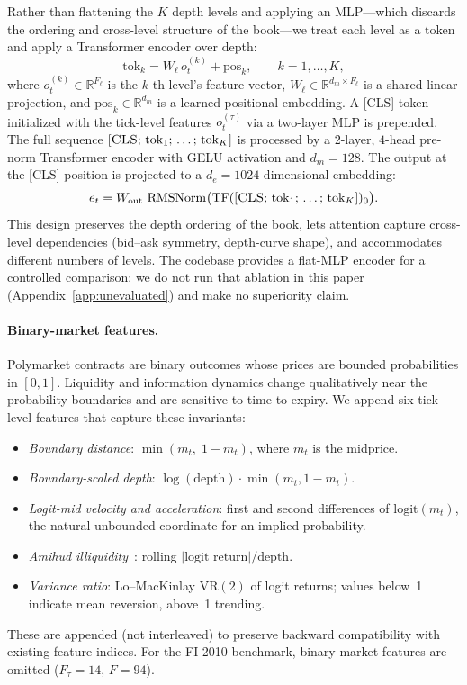 \documentclass{article}
\newcommand{\R}{\mathbb{R}}
\newcommand{\ot}{o_t}
\DeclareMathOperator{\RMSNorm}{RMSNorm}
\begin{document}
Rather than flattening the $K$ depth levels and applying an MLP---which
discards the ordering and cross-level structure of the book---we treat
each level as a token and apply a Transformer encoder over depth:
\begin{equation}\label{eq:lob_enc}
  \mathrm{tok}_k = W_{\ell}\,\ot^{(k)} + \mathrm{pos}_k,
  \qquad k = 1, \ldots, K,
\end{equation}
where $\ot^{(k)} \in \R^{F_\ell}$ is the $k$-th level's feature vector,
$W_\ell \in \R^{d_m \times F_\ell}$ is a shared linear projection, and
$\mathrm{pos}_k \in \R^{d_m}$ is a learned positional embedding.  A
\textsc{[CLS]} token initialized with the tick-level features
$\ot^{(\tau)}$ via a two-layer MLP is prepended.  The full sequence
$[\textsc{CLS};\,\mathrm{tok}_1;\,\ldots;\,\mathrm{tok}_K]$ is processed
by a $2$-layer, $4$-head pre-norm Transformer encoder with GELU
activation and $d_m = 128$.  The output at the \textsc{[CLS]} position
is projected to a $d_e = 1024$-dimensional embedding:
\begin{equation}
  e_t = W_{\text{out}}\,\RMSNorm\bigl(\mathrm{TF}([\textsc{CLS};\,
  \mathrm{tok}_1;\,\ldots;\,\mathrm{tok}_K])_0\bigr).
\end{equation}
This design preserves the depth ordering of the book, lets attention
capture cross-level dependencies (bid--ask symmetry, depth-curve shape),
and accommodates different numbers of levels.  The codebase provides a
flat-MLP encoder for a controlled comparison; we do not run that ablation in
this paper (Appendix~\ref{app:unevaluated}) and make no superiority claim.

\paragraph{Binary-market features.}
Polymarket contracts are binary outcomes whose prices are bounded
probabilities in $[0, 1]$.  Liquidity and information dynamics change
qualitatively near the probability boundaries and are sensitive to
time-to-expiry.  We append six tick-level features that capture these
invariants:
\begin{itemize}[nosep]
  \item \emph{Boundary distance}: $\min(m_t,\; 1 - m_t)$, where $m_t$
    is the midprice.
  \item \emph{Boundary-scaled depth}: $\log(\text{depth}) \cdot
    \min(m_t, 1 - m_t)$.
  \item \emph{Logit-mid velocity and acceleration}: first and second
    differences of $\mathrm{logit}(m_t)$, the natural unbounded
    coordinate for an implied probability.
  \item \emph{Amihud illiquidity}~\citep{amihud2002illiquidity}:
    rolling $|\text{logit return}| / \text{depth}$.
  \item \emph{Variance ratio}: Lo--MacKinlay $\mathrm{VR}(2)$ of logit
    returns; values below~1 indicate mean reversion, above~1 trending.
\end{itemize}
These are appended (not interleaved) to preserve backward compatibility
with existing feature indices.  For the FI-2010 benchmark, binary-market
features are omitted ($F_\tau = 14$, $F = 94$).
\end{document}

